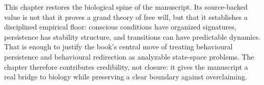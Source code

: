 \begin{summarybox}
This chapter restores the biological spine of the manuscript. Its source-backed
value is not that it proves a grand theory of free will, but that it
establishes a disciplined empirical floor: conscious conditions have organized
signatures, persistence has stability structure, and transitions can have
predictable dynamics. That is enough to justify the book's central move of
treating behavioural persistence and behavioural redirection as analyzable
state-space problems. The chapter therefore contributes credibility, not
closure: it gives the manuscript a real bridge to biology while preserving a
clear boundary against overclaiming.
\end{summarybox}
